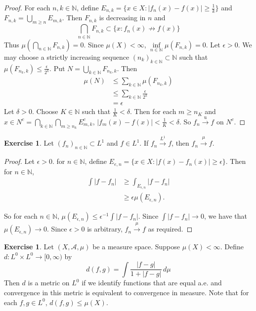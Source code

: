 \documentclass[12pt]{amsart}
\theoremstyle{definition}
\newtheorem{ex}[definition]{Exercise}
\newcommand{\del}{\delta}
\newcommand{\ep}{\epsilon}
\newcommand{\N}{\mathbb{N}}
\newcommand{\MA}{\mathcal{A}}
\newcommand{\dmu}{\, d \mu}
\newcommand{\Rg}{[0,\infty)}
\newcommand{\convt}[1]{\xrightarrow{\text{#1}}}
\newcommand{\conv}[1]{\xrightarrow{#1}}
\newcommand{\lex}[1]{\label{ex:#1}}
\begin{document}
	\begin{proof}
		For each $n, k \in \N$, define $E_{n, k} = \{x \in X: | f_n(x) - f(x) | \geq \frac{1}{k} \}$ and $F_{n,k} = \bigcup\limits_{m \geq n}E_{m,k}$. Then $F_{n,k}$ is decreasing in $n$ and $$\bigcap\limits_{n \in \N}F_{n,k} \subset \{x: f_n(x) \not \rightarrow f(x)\}$$ 
		Thus $\mu(\bigcap\limits_{n \in \N}F_{n,k}) = 0$. Since $\mu(X) < \infty$, $\inf\limits_{n \in \N}\mu(F_{n,k}) = 0$. Let $\ep >0$. We may choose a strictly increasing sequence $(n_k)_{k \in \N} \subset \N$ such that  $\mu(F_{n_k,k}) \leq \frac{\ep}{2^{k}}$. Put $N = \bigcup\limits_{k \in \N}F_{n_k,k}$. Then 
		\begin{align*}
			\mu(N) 
			&\leq \sum\limits_{k \in \N}\mu(F_{n_k,k}) \\
			& \leq \sum\limits_{k \in \N} \frac{\ep}{2^k}\\
			& = \ep
		\end{align*} 
		Let $\del > 0$. Choose $K \in \N$ such that $\frac{1}{K} < \del$. Then for each $m \geq n_K$ and $x \in N^c =\bigcap\limits_{k \in \N}\bigcap\limits_{m \geq n_k}E_{m,k}^c$, $|f_m(x)- f(x)| < \frac{1}{K} < \del$. So $f_n \convt{u} f$ on $N^c$. 
	\end{proof}
	
	\begin{ex} \lex{35006} 
		Let $(f_n)_{n \in \N} \subset L^1$ and $f \in L^1$. If $f_n \xrightarrow{L^1}f$, then $f_n \conv{\mu} f$.
	\end{ex}
	
	\begin{proof}
		Let $\ep >0$. for $n \in \N$, define $E_{e,n} = \{x \in X: |f(x) - f_n(x)|\geq \ep\}$. Then for $n \in \N$,
		\begin{align*}
			\int |f - f_n|
			& \geq \int_{E_{\ep,n}} |f- f_n|\\
			& \geq \ep \mu(E_{\ep,n}).
		\end{align*}
		
		So for each $n \in \N$, $\mu(E_{\ep, n}) \leq \ep^{-1}\int |f - f_n|$. Since $\int |f - f_n| \rightarrow 0$, we have that $\mu(E_{\ep,n}) \rightarrow 0$. Since $\ep >0$ is arbitrary, $f_n \conv{\mu} f$ as required. 
	\end{proof}
	
	\begin{ex} \lex{35007} 
		Let $(X, \MA, \mu)$ be a measure space. Suppose $\mu(X) < \infty$. Define $d:L^0 \times L^0 \rightarrow \Rg$ by $$d(f,g) = \int \frac{|f-g|}{1+|f-g|} \dmu $$
		Then $d$ is a metric on $L^0$ if we identify functions that are equal a.e. and convergence in this metric is equivalent to convergence in measure. Note that for each $f,g \in L^0$, $d(f,g) \leq \mu(X)$.
	\end{ex} 
	
\end{document}
